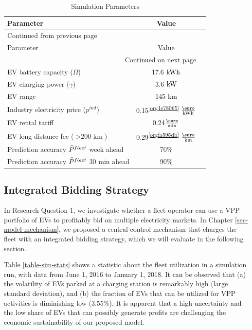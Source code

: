 \documentclass[a4paper, 12pt]{article}
\begin{document}
\begin{longtable}{l|cc}
\caption[Simulation Parameters]{Simulation Parameters \label{table-sim-params}}
\\
\hline
\hline
Parameter & Value\\
\hline
\endfirsthead
\multicolumn{2}{l}{Continued from previous page} \\
\hline

Parameter & Value \\

\hline
\endhead
\hline\multicolumn{2}{r}{Continued on next page} \\
\endfoot
\endlastfoot
\hline
EV battery capacity (\(\Omega\)) & 17.6 \(\text{kWh}\)\\
EV charging power   (\(\gamma\)) & 3.6 \(\text{kW}\)\\
EV range & 145 km\\
Industry electricity price  (\(p^{ind}\)) & 0.15\textsuperscript{\ref{org1e78065}} \(\ekwh\)\\
EV rental tariff & 0.24\footnotemark \(\frac{\eur}{\text{min}}\)\\
EV long distance fee (\(>\text{200 km}\)) & 0.29\textsuperscript{\ref{orgfa595db}} \(\frac{\eur}{\text{km}}\)\\
\hline
Prediction accuracy \(\widehat{P}^{fleet}_{}\) week ahead & 70\%\\
Prediction accuracy \(\widehat{P}^{fleet}_{}\) 30 min ahead & 90\%\\
\hline
\hline
\end{longtable}

\subsection{Integrated Bidding Strategy}
\label{sec:orgafea1dd}
In Research Question 1, we investigate whether a fleet operator can use a VPP
portfolio of EVs to profitably bid on multiple electricity markets. In Chapter
\ref{sec-model-mechanism}, we proposed a central control mechanism that charges
the fleet with an integrated bidding strategy, which we will evaluate in the
following section.

Table \ref{table-sim-stats} shows a statistic about the fleet utilization in a
simulation run, with data from June 1, 2016 to January 1, 2018. It can be
observed that (a) the volatility of EVs parked at a charging station is
remarkably high (large standard deviation), and (b) the fraction of EVs that can
be utilized for VPP activities is diminishing low (3.55\%). It is apparent that a
high uncertainty and the low share of EVs that can possibly generate profits are
challenging the economic sustainability of our proposed model.
\end{document}
